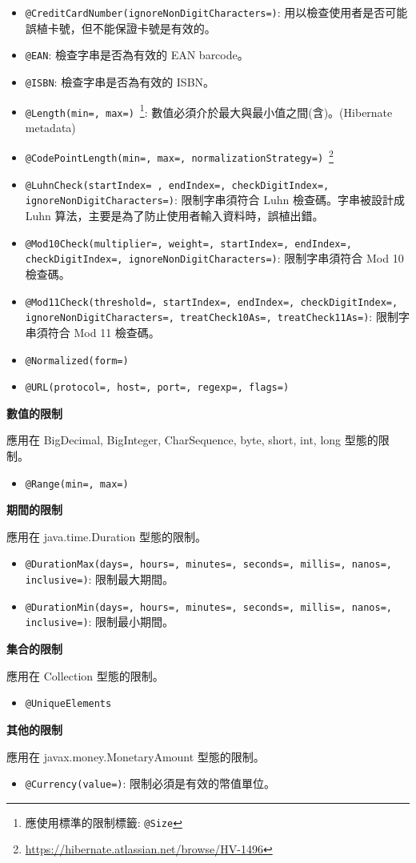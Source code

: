 \begin{itemize}
\item \texttt{@CreditCardNumber(ignoreNonDigitCharacters=)}: 用以檢查使用者是否可能誤植卡號，但不能保證卡號是有效的。
\item \texttt{@EAN}: 檢查字串是否為有效的 EAN barcode。
\item \texttt{@ISBN}: 檢查字串是否為有效的 ISBN。
\item \texttt{@Length(min=, max=)}~\footnote{應使用標準的限制標籤: \texttt{@Size}}: 數值必須介於最大與最小值之間(含)。(Hibernate metadata)
\item \texttt{@CodePointLength(min=, max=, normalizationStrategy=)}~\footnote{\url{https://hibernate.atlassian.net/browse/HV-1496}}
\item \texttt{@LuhnCheck(startIndex= , endIndex=, checkDigitIndex=, ignoreNonDigitCharacters=)}: 限制字串須符合 Luhn 檢查碼。字串被設計成 Luhn 算法，主要是為了防止使用者輸入資料時，誤植出錯。
\item \texttt{@Mod10Check(multiplier=, weight=, startIndex=, endIndex=, checkDigitIndex=, ignoreNonDigitCharacters=)}: 限制字串須符合 Mod 10 檢查碼。
\item \texttt{@Mod11Check(threshold=, startIndex=, endIndex=, checkDigitIndex=, ignoreNonDigitCharacters=, treatCheck10As=, treatCheck11As=)}: 限制字串須符合 Mod 11 檢查碼。
\item \texttt{@Normalized(form=)}
\item \texttt{@URL(protocol=, host=, port=, regexp=, flags=)}
\end{itemize}

\noindent\textbf{數值的限制}\vspace{10pt}

應用在 BigDecimal, BigInteger, CharSequence, byte, short, int, long 型態的限制。

\begin{itemize}
\item \texttt{@Range(min=, max=)}
\end{itemize}

\noindent\textbf{期間的限制}\vspace{10pt}

應用在 java.time.Duration 型態的限制。

\begin{itemize}
\item \texttt{@DurationMax(days=, hours=, minutes=, seconds=, millis=, nanos=, inclusive=)}: 限制最大期間。
\item \texttt{@DurationMin(days=, hours=, minutes=, seconds=, millis=, nanos=, inclusive=)}: 限制最小期間。
\end{itemize}

\noindent\textbf{集合的限制}\vspace{10pt}

應用在 Collection 型態的限制。

\begin{itemize}
\item \texttt{@UniqueElements}
\end{itemize}

\noindent\textbf{其他的限制}\vspace{10pt}

應用在 javax.money.MonetaryAmount 型態的限制。

\begin{itemize}
\item \texttt{@Currency(value=)}: 限制必須是有效的幣值單位。
\end{itemize}